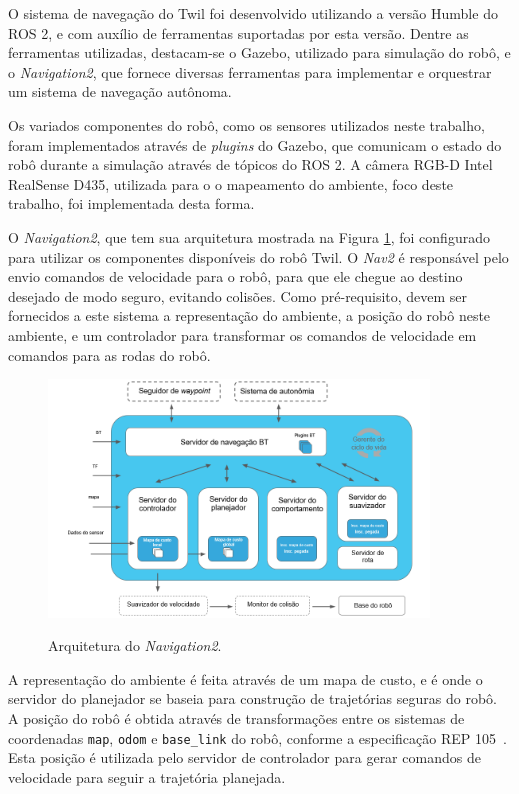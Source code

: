 \documentclass[repeatfields,xlists,xpacks,oneside,yearsonly]{ufrgscca}
\begin{document}
O sistema de navegação do Twil foi desenvolvido utilizando a versão
Humble do ROS 2, e com auxílio de ferramentas suportadas por esta
versão. Dentre as ferramentas utilizadas, destacam-se o Gazebo,
utilizado para simulação do robô, e o \textit{Navigation2}, que
fornece diversas ferramentas para implementar e orquestrar um sistema
de navegação autônoma.

Os variados componentes do robô, como os sensores utilizados neste
trabalho, foram implementados através de \textit{plugins} do Gazebo,
que comunicam o estado do robô durante a simulação através de tópicos
do ROS 2. A câmera RGB-D Intel RealSense D435, utilizada para o o
mapeamento do ambiente, foco deste trabalho, foi implementada desta
forma.

O \textit{Navigation2}, que tem sua arquitetura mostrada na Figura
\ref{fig:nav2_arc}, foi configurado para utilizar os componentes
disponíveis do robô Twil. O \textit{Nav2} é responsável pelo envio
comandos de velocidade para o robô, para que ele chegue ao destino
desejado de modo seguro, evitando colisões. Como pré-requisito, devem
ser fornecidos a este sistema a representação do ambiente, a posição
do robô neste ambiente, e um controlador para transformar os comandos
de velocidade em comandos para as rodas do robô.

\begin{figure}[h]
    {
        \centering
        \caption{Arquitetura do \textit{Navigation2}.}
        \label{fig:nav2_arc}
        \includegraphics[width=0.9\textwidth]{nav2_architecture_trad.png}\\
    }
    {} %
\end{figure}

A representação do ambiente é feita através de um mapa de custo, e é
onde o servidor do planejador se baseia para construção de
trajetórias seguras do robô. A posição do robô é obtida através de
transformações entre os sistemas de coordenadas \texttt{map},
\texttt{odom} e \texttt{base\_link} do robô, conforme a especificação
REP 105~\cite{rep_105}. Esta posição é utilizada pelo servidor de
controlador para gerar comandos de velocidade para seguir a
trajetória planejada.
\end{document}
